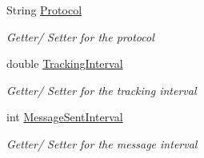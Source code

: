 \begin{DoxyCompactItemize}
String \hyperlink{class_web_analyzer_1_1_models_1_1_data_model_1_1_test_model_a4811dcec47a39aca2cdb24447e7b232a}{Protocol}
\begin{DoxyCompactList}\small\item\em Getter/ Setter for the protocol \end{DoxyCompactList}\item 
double \hyperlink{class_web_analyzer_1_1_models_1_1_data_model_1_1_test_model_a8f50461cf57a8d7c48b795b28335fbd3}{Tracking\+Interval}
\begin{DoxyCompactList}\small\item\em Getter/ Setter for the tracking interval \end{DoxyCompactList}\item 
int \hyperlink{class_web_analyzer_1_1_models_1_1_data_model_1_1_test_model_afe3c73f555081b0e3aceb662c361fcab}{Message\+Sent\+Interval}
\begin{DoxyCompactList}\small\item\em Getter/ Setter for the message interval \end{DoxyCompactList}\end{DoxyCompactItemize}
